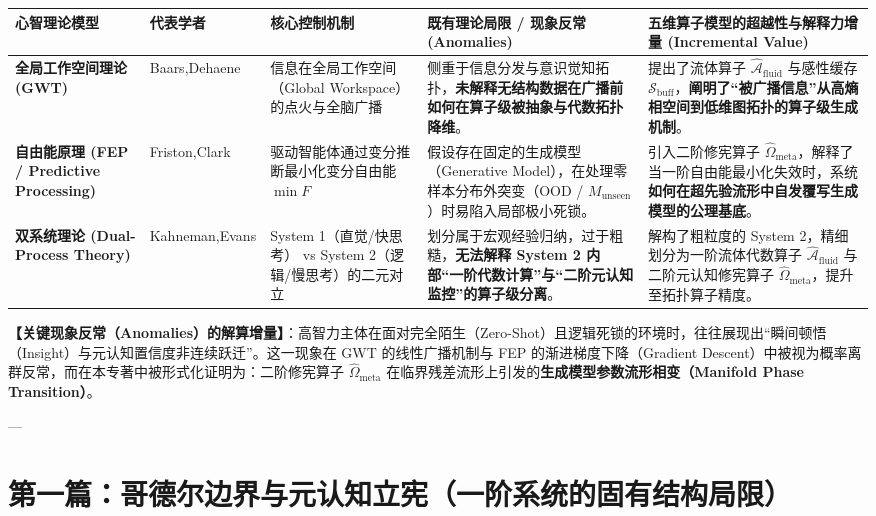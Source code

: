 \documentclass[11pt,a4paper,oneside]{ctexart}
\begin{document}
\begin{table}[htbp]
\centering
\small
\begin{tabular}{p{2.2cm}p{2.5cm}p{2.5cm}p{2.3cm}p{5.0cm}}
\toprule
心智理论模型 & 代表学者 & 核心控制机制 & 既有理论局限 / 现象反常 (Anomalies) & \textbf{五维算子模型的超越性与解释力增量 (Incremental Value)} \\
\midrule
\textbf{全局工作空间理论 (GWT)} & Baars,\newline Dehaene & 信息在全局工作空间（Global Workspace）的点火与全脑广播 & 侧重于信息分发与意识觉知拓扑，\textbf{未解释无结构数据在广播前如何在算子级被抽象与代数拓扑降维}。 & 提出了流体算子 $\hat{\mathcal{A}}_{\text{fluid}}$ 与感性缓存 $\mathcal{S}_{\text{buff}}$，\textbf{阐明了“被广播信息”从高熵相空间到低维图拓扑的算子级生成机制}。 \\
\textbf{自由能原理 (FEP / Predictive Processing)} & Friston,\newline Clark & 驱动智能体通过变分推断最小化变分自由能 $\min F$ & 假设存在固定的生成模型（Generative Model），在处理\textit{}零样本分布外突变（OOD / $M_{\text{unseen}}$）时易陷入局部极小死锁\textit{}。 & 引入二阶修宪算子 $\hat{\Omega}_{\text{meta}}$，解释了当一阶自由能最小化失效时，系统\textbf{如何在超先验流形中自发覆写生成模型的公理基底}。 \\
\textbf{双系统理论 (Dual-Process Theory)} & Kahneman,\newline Evans & System 1（直觉/快思考） vs System 2（逻辑/慢思考）的二元对立 & 划分属于宏观经验归纳，过于粗糙，\textbf{无法解释 System 2 内部“一阶代数计算”与“二阶元认知监控”的算子级分离}。 & 解构了粗粒度的 System 2，精细划分为\textit{}一阶流体代数算子 $\hat{\mathcal{A}}_{\text{fluid}}$ 与二阶元认知修宪算子 $\hat{\Omega}_{\text{meta}}$\textit{}，提升至拓扑算子精度。 \\
\bottomrule
\end{tabular}
\end{table}

\begin{notebox}
\textbf{【关键现象反常（Anomalies）的解算增量】}：高智力主体在面对完全陌生（Zero-Shot）且逻辑死锁的环境时，往往展现出“瞬间顿悟（Insight）与元认知置信度非连续跃迁”。这一现象在 GWT 的线性广播机制与 FEP 的渐进梯度下降（Gradient Descent）中被视为概率离群反常，而在本专著中被形式化证明为：二阶修宪算子 $\hat{\Omega}_{\text{meta}}$ 在临界残差流形上引发的\textbf{生成模型参数流形相变（Manifold Phase Transition）}。
\end{notebox}

---


\part{第一篇：哥德尔边界与元认知立宪（一阶系统的固有结构局限）}
\end{document}
